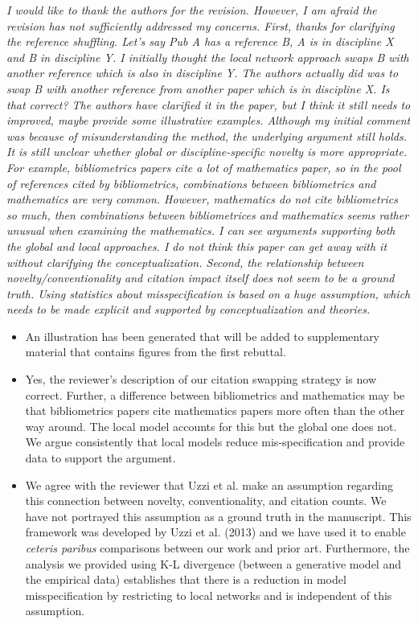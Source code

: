\documentclass[11pt, oneside]{article}   	%
\begin{document}
\emph{I would like to thank the authors for the revision.  However, I am afraid the revision has not sufficiently addressed my concerns. First, thanks for clarifying the reference shuffling.  Let’s say Pub A has a reference B, A is in discipline X and B in discipline Y.  I initially thought the local network approach swaps B with another reference which is also in discipline Y.  The authors actually did was to swap B with another reference from another paper which is in discipline X.  Is that correct?  The authors have clarified it in the paper, but I think it still needs to improved, maybe provide some illustrative examples.  Although my initial comment was because of misunderstanding the method, the underlying argument still holds.  It is still unclear whether global or discipline-specific novelty is more appropriate.  For example, bibliometrics papers cite a lot of mathematics paper, so in the pool of references cited by bibliometrics, combinations between bibliometrics and mathematics are very common. However, mathematics do not cite bibliometrics so much, then combinations between bibliometrices and mathematics seems rather unusual when examining the mathematics. I can see arguments supporting both the global and local approaches. I do not think this paper can get away with it without clarifying the conceptualization. Second, the relationship between novelty/conventionality and citation impact itself does not seem to be a ground truth. Using statistics about misspecification is based on a huge assumption, which needs to be made explicit and supported by conceptualization and theories.}

\begin{itemize}
\item An illustration has been generated that will be added to supplementary material that contains figures from the first rebuttal.
\item Yes, the reviewer's description of our citation swapping strategy is now correct. Further, a difference between bibliometrics and mathematics may be that bibliometrics papers cite mathematics papers more often than the other way around. The local model accounts for this but the global one does not. We argue consistently that local models reduce mis-specification and provide data to support the argument.
\item We agree with the reviewer that Uzzi et al. make an assumption regarding this connection between novelty, conventionality, and citation counts. We have not portrayed this assumption as a ground truth in the manuscript. This framework was developed by Uzzi et al. (2013) and we have used it to enable \emph{ceteris paribus} comparisons between our work and prior art. Furthermore, the analysis we provided using K-L divergence (between a generative model and the empirical data) establishes that there is a reduction in model misspecification by restricting to local networks and is independent of this assumption.
\end{itemize}
\end{document}
